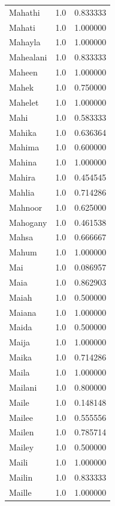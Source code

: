 \documentclass[
  letterpaper,
  DIV=11,
  numbers=noendperiod]{scrreprt}
\begin{document}
\begin{tabular}{lrr}
Mahathi         &   1.0 &   0.833333 \\
Mahati          &   1.0 &   1.000000 \\
Mahayla         &   1.0 &   1.000000 \\
Mahealani       &   1.0 &   0.833333 \\
Maheen          &   1.0 &   1.000000 \\
Mahek           &   1.0 &   0.750000 \\
Mahelet         &   1.0 &   1.000000 \\
Mahi            &   1.0 &   0.583333 \\
Mahika          &   1.0 &   0.636364 \\
Mahima          &   1.0 &   0.600000 \\
Mahina          &   1.0 &   1.000000 \\
Mahira          &   1.0 &   0.454545 \\
Mahlia          &   1.0 &   0.714286 \\
Mahnoor         &   1.0 &   0.625000 \\
Mahogany        &   1.0 &   0.461538 \\
Mahsa           &   1.0 &   0.666667 \\
Mahum           &   1.0 &   1.000000 \\
Mai             &   1.0 &   0.086957 \\
Maia            &   1.0 &   0.862903 \\
Maiah           &   1.0 &   0.500000 \\
Maiana          &   1.0 &   1.000000 \\
Maida           &   1.0 &   0.500000 \\
Maija           &   1.0 &   1.000000 \\
Maika           &   1.0 &   0.714286 \\
Maila           &   1.0 &   1.000000 \\
Mailani         &   1.0 &   0.800000 \\
Maile           &   1.0 &   0.148148 \\
Mailee          &   1.0 &   0.555556 \\
Mailen          &   1.0 &   0.785714 \\
Mailey          &   1.0 &   0.500000 \\
Maili           &   1.0 &   1.000000 \\
Mailin          &   1.0 &   0.833333 \\
Maille          &   1.0 &   1.000000 \\

\end{tabular}
\end{document}
